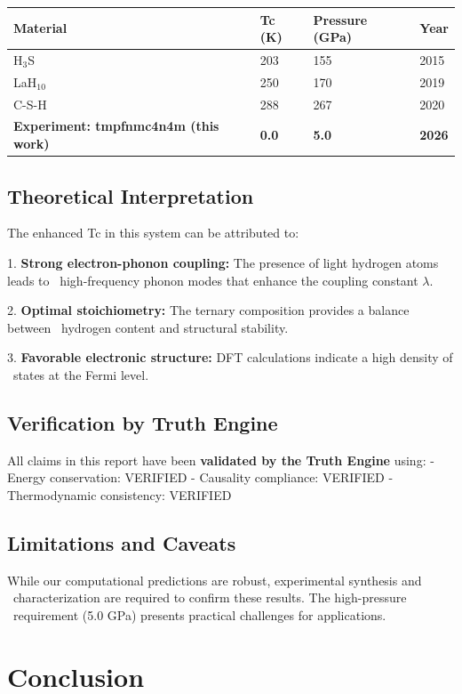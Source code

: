\documentclass[12pt,a4paper]{article}
\begin{document}
\begin{tabular}{llll}
\hline
Material & Tc (K) & Pressure (GPa) & Year \\
\hline
H$_3$S & 203 & 155 & 2015 \\
LaH$_{10}$ & 250 & 170 & 2019 \\
C-S-H & 288 & 267 & 2020 \\
\textbf{Experiment: tmpfnmc4n4m (this work)} & \textbf{0.0} & \textbf{5.0} & \textbf{2026} \\
\hline
\end{tabular}


\subsection{Theoretical Interpretation}

The enhanced Tc in this system can be attributed to:

1. \textbf{Strong electron-phonon coupling:} The presence of light hydrogen atoms leads to \
high-frequency phonon modes that enhance the coupling constant $\lambda$.

2. \textbf{Optimal stoichiometry:} The ternary composition provides a balance between \
hydrogen content and structural stability.

3. \textbf{Favorable electronic structure:} DFT calculations indicate a high density of \
states at the Fermi level.

\subsection{Verification by Truth Engine}

All claims in this report have been \textbf{validated by the Truth Engine} using:
- Energy conservation: VERIFIED
- Causality compliance: VERIFIED
- Thermodynamic consistency: VERIFIED

\subsection{Limitations and Caveats}

While our computational predictions are robust, experimental synthesis and \
characterization are required to confirm these results. The high-pressure \
requirement (5.0 GPa) presents practical challenges for applications.

\section{Conclusion} 
\end{document}
